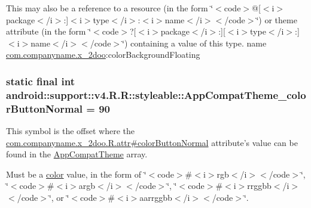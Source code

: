 This may also be a reference to a resource (in the form \char`\"{}$<$code$>$@\mbox{[}$<$i$>$package$<$/i$>$:\mbox{]}$<$i$>$type$<$/i$>$:$<$i$>$name$<$/i$>$$<$/code$>$\char`\"{}) or theme attribute (in the form \char`\"{}$<$code$>$?\mbox{[}$<$i$>$package$<$/i$>$:\mbox{]}\mbox{[}$<$i$>$type$<$/i$>$:\mbox{]}$<$i$>$name$<$/i$>$$<$/code$>$\char`\"{}) containing a value of this type.  name \hyperlink{namespacecom_1_1companyname_1_1x__2doo}{com.companyname.x\_\-2doo}:colorBackgroundFloating \hypertarget{classandroid_1_1support_1_1v4_1_1_r_1_1styleable_9222a7848886917a4f8f848b38a41538}{
\subsubsection[{AppCompatTheme\_\-colorButtonNormal}]{\setlength{\rightskip}{0pt plus 5cm}static final int android::support::v4.R.R::styleable::AppCompatTheme\_\-colorButtonNormal = 90}}
\label{classandroid_1_1support_1_1v4_1_1_r_1_1styleable_9222a7848886917a4f8f848b38a41538}


This symbol is the offset where the \hyperlink{classcom_1_1companyname_1_1x__2doo_1_1_r_1_1attr_b674806ea7da66e7b679071476fa0e20}{com.companyname.x\_\-2doo.R.attr\#colorButtonNormal} attribute's value can be found in the \hyperlink{classandroid_1_1support_1_1v4_1_1_r_1_1styleable_0873e92ba21076bb5a4aeadeb7f5779f}{AppCompatTheme} array.

Must be a \hyperlink{classandroid_1_1support_1_1v4_1_1_r_1_1color}{color} value, in the form of \char`\"{}$<$code$>$\#$<$i$>$rgb$<$/i$>$$<$/code$>$\char`\"{}, \char`\"{}$<$code$>$\#$<$i$>$argb$<$/i$>$$<$/code$>$\char`\"{}, \char`\"{}$<$code$>$\#$<$i$>$rrggbb$<$/i$>$$<$/code$>$\char`\"{}, or \char`\"{}$<$code$>$\#$<$i$>$aarrggbb$<$/i$>$$<$/code$>$\char`\"{}. 

